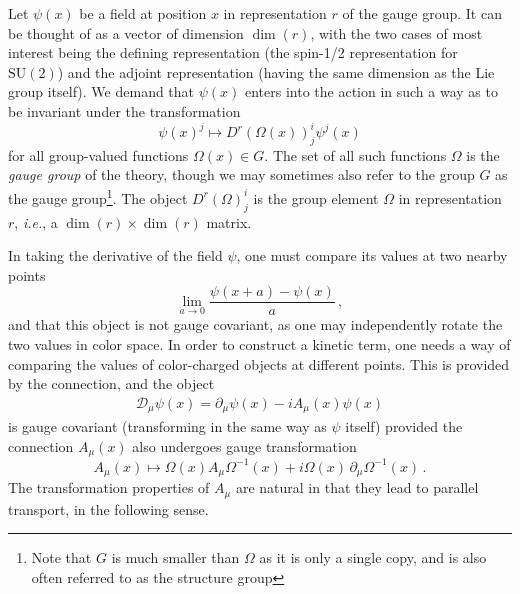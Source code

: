 \documentclass[reprint,superscriptaddress,pra,nofootinbib,preprintnumbers,floatfix]{revtex4-1}
\providecommand{\ie}{\emph{i.e.}}
\providecommand{\sutwo}{$\mathrm{SU}(2)$\xspace}
\begin{document}
Let $\psi(x)$ be a field at position $x$ in representation $r$ of the gauge group. 
%
It can be thought of as a vector of dimension $\dim(r)$, with the two cases of most interest being the defining representation (the spin-1/2 representation for \sutwo) and the adjoint representation (having the same dimension as the Lie group itself). 
%
We demand that $\psi(x)$ enters into the action in such a way as to be invariant under the transformation
%
\begin{equation}
    \psi(x)^j \longmapsto D^r(\Omega(x))^i_j \psi^j(x) 
\end{equation}
%
for all group-valued functions $\Omega(x) \in G$. 
%
The set of all such functions $\Omega$ is the \emph{gauge group} of the theory, though we may sometimes also refer to the group $G$ as the gauge group\footnote{Note that $G$ is much smaller than $\Omega$ as it is only a single copy, and is also often referred to as the structure group}. 
%
The object $D^r(\Omega)^i_j$ is the group element $\Omega$ in representation $r$, \ie, a $\dim(r) \times \dim(r)$ matrix.  



In taking the derivative of the field $\psi$, one must compare its values at two nearby points 
%
\begin{equation}
  \lim_{a \to 0} \frac{\psi(x+a) - \psi(x)}{a} \,,
\end{equation}
%
and that this object is not gauge covariant, as one may independently rotate the two values in color space.
%
In order to construct a kinetic term, one needs a way of comparing the values of color-charged objects at different points. 
%
This is provided by the connection, and the object
\begin{align}
    \mathcal{D}_\mu \psi(x) = \partial_\mu \psi(x) - i A_\mu(x) \psi(x)
\end{align}
is gauge covariant (transforming in the same way as $\psi$ itself) provided the connection $A_\mu(x)$ also undergoes gauge transformation 
%
\begin{equation}\label{eq:connection_gauge_transform}
    A_\mu(x) \longmapsto \Omega(x) A_\mu \Omega^{-1}(x) + i \Omega(x)\, \partial_\mu \Omega^{-1}(x) \,.
\end{equation}
%
The transformation properties of $A_\mu$ are natural in that they lead to parallel transport, in the following sense.
\end{document}
